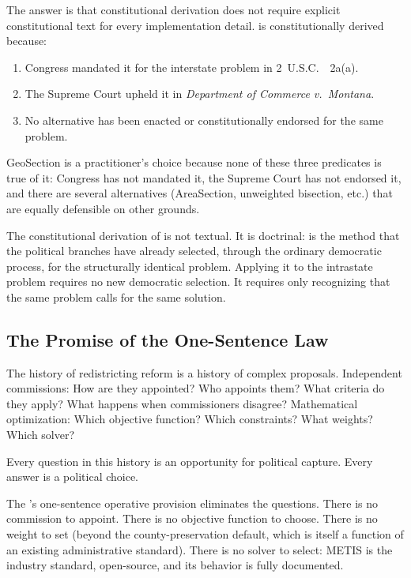 The answer is that constitutional derivation does not require explicit
constitutional text for every implementation detail.
\hh{} is constitutionally derived because:
\begin{enumerate}
  \item Congress mandated it for the interstate problem in 2~U.S.C.~\usca{}~2a(a).
  \item The Supreme Court upheld it in \textit{Department of Commerce
    v.\ Montana}.
  \item No alternative has been enacted or constitutionally endorsed for
    the same problem.
\end{enumerate}
GeoSection is a practitioner's choice because none of these three predicates
is true of it: Congress has not mandated it, the Supreme Court has not
endorsed it, and there are several alternatives (AreaSection, unweighted
bisection, etc.) that are equally defensible on other grounds.

The constitutional derivation of \ar{} is not textual.
It is doctrinal: \hh{} is the method that the political branches have already
selected, through the ordinary democratic process, for the structurally identical
problem.
Applying it to the intrastate problem requires no new democratic selection.
It requires only recognizing that the same problem calls for the same solution.

\subsection{The Promise of the One-Sentence Law}

The history of redistricting reform is a history of complex proposals.
Independent commissions: How are they appointed? Who appoints them?
What criteria do they apply? What happens when commissioners disagree?
Mathematical optimization: Which objective function? Which constraints?
What weights? Which solver?

Every question in this history is an opportunity for political capture.
Every answer is a political choice.

The \dia{}'s one-sentence operative provision eliminates the questions.
There is no commission to appoint.
There is no objective function to choose.
There is no weight to set (beyond the county-preservation default, which is
itself a function of an existing administrative standard).
There is no solver to select: METIS is the industry standard, open-source,
and its behavior is fully documented.

